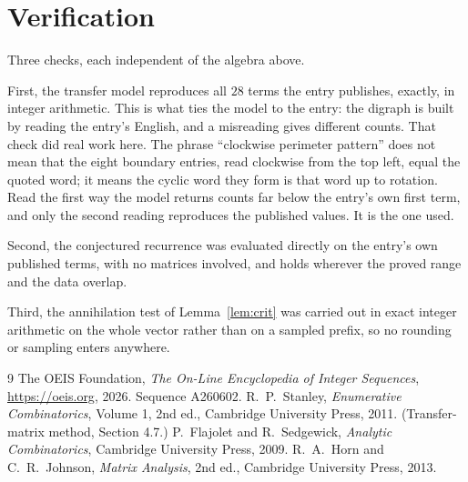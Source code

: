 \documentclass[11pt,a4paper]{article}
\theoremstyle{plain}
\theoremstyle{definition}
\begin{document}
\section{Verification}

Three checks, each independent of the algebra above.

First, the transfer model reproduces all $28$ terms the entry publishes, exactly, in
integer arithmetic. This is what ties the model to the entry: the digraph is built by reading
the entry's English, and a misreading gives different counts. That check did real work here. The phrase ``clockwise perimeter pattern'' does not mean that the eight boundary entries, read clockwise from the top left, equal the quoted word; it means the cyclic word they form is that word up to rotation. Read the first way the model returns counts far below the entry's own first term, and only the second reading reproduces the published values. It is the one used.

Second, the conjectured recurrence was evaluated directly on the entry's own published terms,
with no matrices involved, and holds wherever the proved range and the data overlap.

Third, the annihilation test of Lemma~\ref{lem:crit} was carried out in exact integer
arithmetic on the whole vector rather than on a sampled prefix, so no rounding or sampling
enters anywhere.

\begin{thebibliography}{9}
 The OEIS Foundation, \emph{The On-Line Encyclopedia of Integer
Sequences}, \url{https://oeis.org}, 2026. Sequence A260602.
 R.~P.~Stanley, \emph{Enumerative Combinatorics}, Volume 1, 2nd ed.,
Cambridge University Press, 2011. (Transfer-matrix method, Section 4.7.)
 P.~Flajolet and R.~Sedgewick, \emph{Analytic Combinatorics}, Cambridge
University Press, 2009.
 R.~A.~Horn and C.~R.~Johnson, \emph{Matrix Analysis}, 2nd ed., Cambridge
University Press, 2013.
\end{thebibliography}
\end{document}
